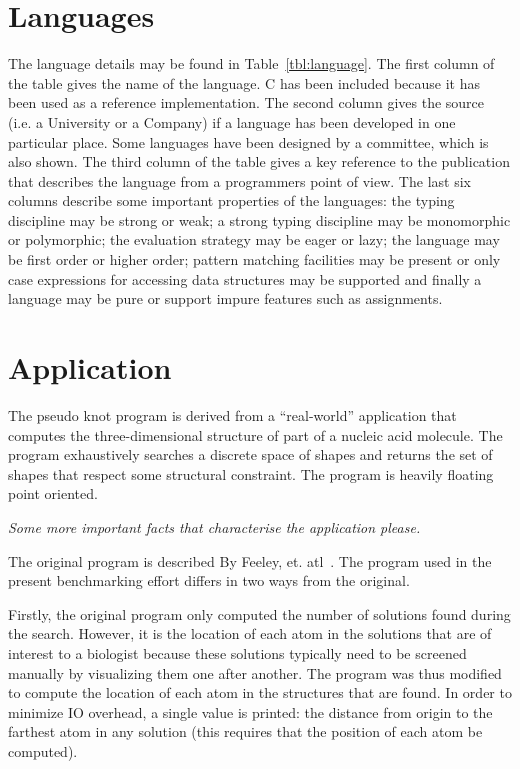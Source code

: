 \section{Languages}
The language details may be found in Table~\ref{tbl:language}. The
first column of the table gives the name of the language. C has been
included because it has been used as a reference implementation. The
second column gives the source (i.e. a University or a Company) if a
language has been developed in one particular place. Some languages
have been designed by a committee, which is also shown. The third
column of the table gives a key reference to the publication that
describes the language from a programmers point of view. The last six
columns describe some important properties of the languages: the typing
discipline may be strong or weak; a strong typing discipline may be
monomorphic or polymorphic; the evaluation strategy may be eager or
lazy; the language may be first order or higher order; pattern matching
facilities may be present or only case expressions for accessing data
structures may be supported and finally a language may be pure or
support impure features such as assignments.


\section{Application}
The pseudo knot program is derived from a ``real-world'' application
that computes the three-dimensional structure of part of a nucleic acid
molecule. The program exhaustively searches a discrete space of shapes
and returns the set of shapes that respect some structural constraint.
The program is heavily floating point oriented.

{\em Some more important facts that characterise the application please.}

The original program is described By Feeley, et. atl~\cite{Fee94}. The
program used in the present benchmarking effort differs in two ways
from the original.

Firstly, the original program only computed the number of solutions
found during the search. However, it is the location of each atom in
the solutions that are of interest to a biologist because these
solutions typically need to be screened manually by visualizing them
one after another. The program was thus modified to compute the
location of each atom in the structures that are found. In order to
minimize IO overhead, a single value is printed: the distance from
origin to the farthest atom in any solution (this requires that the
position of each atom be computed).

